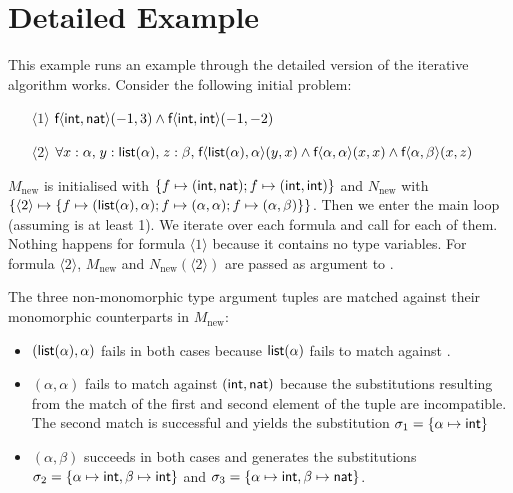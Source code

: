 \documentclass[runningheads]{llncs}
\begin{document}



\appendix

\section{Detailed Example}
\label{app}

\begin{examplex}\rm
This example runs an example through the detailed version of the iterative algorithm works. Consider the following initial problem:
\begin{itemize}
   \item[\(\langle1\rangle\)] \(\textsf{f}\langle \textsf{int}, \textsf{nat}\rangle(-1, 3) \land \textsf{f}\langle \textsf{int}, \textsf{int}\rangle(-1, -2)\)
   \item[\(\langle 2\rangle\)] \(\forall x: \alpha{,}\; y:\textsf{list}(\alpha){,}\; z: \beta{,}\; \textsf{f}\langle \textsf{list}(\alpha), \alpha\rangle(y, x) \land \textsf{f}\langle \alpha, \alpha \rangle(x, x) \land \textsf{f}\langle \alpha, \beta\rangle(x, z)\)
\end{itemize}
%
\(M_{\text{new}}\) is initialised with \(\{f\mapsto (\textsf{int}, \textsf{nat}); f\mapsto (\textsf{int}, \textsf{int})\}\) and \(N_{\text{new}}\) with \(\{\langle 2\rangle\mapsto \{f\mapsto (\textsf{list}(\alpha), \alpha); f\mapsto (\alpha, \alpha); f\mapsto (\alpha, \beta)\}\}\). Then we enter the main loop (assuming \Loop is at least 1). We iterate over each formula and call \FStep for each of them. Nothing happens for formula \(\langle1\rangle\) because it contains no type variables. For formula \(\langle2\rangle\), \(M_{\text{new}}\) and \(N_{\text{new}}(\langle2\rangle)\) are passed as argument to \SubstGen.

The three non-monomorphic type argument tuples are matched against their monomorphic counterparts in \(M_{\text{new}}\):
\begin{itemize}
   \item \((\textsf{list}(\alpha), \alpha)\) fails in both cases because \(\textsf{list}(\alpha)\) fails to match against .
   \item \((\alpha, \alpha)\) fails to match against \((\textsf{int}, \textsf{nat})\) because the substitutions resulting from the match of the first and second element of the tuple are incompatible. The second match is successful and yields the substitution \(\sigma_1 = \{\alpha \mapsto \textsf{int}\}\)
   \item \((\alpha, \beta)\) succeeds in both cases and generates the substitutions \(\sigma_2 = \{\alpha \mapsto \textsf{int}, \beta \mapsto \textsf{int}\}\) and \(\sigma_3 = \{\alpha \mapsto \textsf{int}, \beta \mapsto \textsf{nat}\}\).
\end{itemize}


\end{examplex}
\end{document}
